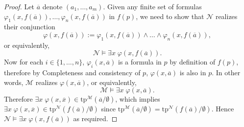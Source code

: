 \documentclass{article}
\begin{document}
\begin{enumerate}[label={\bf Q\arabic*:}]
\begin{enumerate}
        \begin{proof}
          Let $\overline{a}$ denote $(a_1,\ldots,a_m)$. Given any finite
          set of formulas
          $\varphi_1(x,f(\overline{a})),\ldots,\varphi_n(x,f(\overline{a}))$
          in $f(p)$, we need to show that $\mathcal{N}$ realizes their
          conjunction \[\varphi(x,f(\overline{a})):=
          \varphi_1(x,f(\overline{a}))\wedge
          \ldots\wedge\varphi_n(x,f(\overline{a})),\] or equivalently,
          \[\mathcal{N}\models\exists x\; \varphi(x,f(\overline{a})).\]
          Now for each $i\in\{1,\ldots,n\}$, $\varphi_i(x,\overline{a})$ is
          a formula in $p$ by definition of $f(p)$, therefore by
          Completeness and consistency of $p$, $\varphi(x,\overline{a})$ is
          also in $p$. In other words, $\mathcal{M}$ realizes
          $\varphi(x,\overline{a})$, or equivalently,
          \[\mathcal{M}\models\exists x\; \varphi(x,\overline{a}).\]
          Therefore
          $\exists x\; \varphi(x,\overline{x})\in
          \text{tp}^\mathcal{M}(\overline{a}/\emptyset)$, which implies
          $\exists x\; \varphi(x,\overline{x})\in
          \text{tp}^\mathcal{N}(f(\overline{a})/\emptyset)$ since
          $\text{tp}^\mathcal{M}(\overline{a}/\emptyset)=
          \text{tp}^\mathcal{N}(f(\overline{a})/\emptyset)$. Hence
          $\mathcal{N}\models\exists x\; \varphi(x,f(\overline{a}))$ as
          required.
        \end{proof}
    \end{enumerate}
\end{enumerate}
\end{document}
